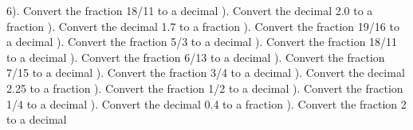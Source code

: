 \documentclass{article}%
\begin{document}
6). Convert the fraction 18/11 to a decimal%
\newline%
\newline%
). Convert the decimal 2.0 to a fraction%
\newline%
\newline%
). Convert the decimal 1.7 to a fraction%
\newline%
\newline%
). Convert the fraction 19/16 to a decimal%
\newline%
\newline%
). Convert the fraction 5/3 to a decimal%
\newline%
\newline%
). Convert the fraction 18/11 to a decimal%
\newline%
\newline%
). Convert the fraction 6/13 to a decimal%
\newline%
\newline%
). Convert the fraction 7/15 to a decimal%
\newline%
\newline%
). Convert the fraction 3/4 to a decimal%
\newline%
\newline%
). Convert the decimal 2.25 to a fraction%
\newline%
\newline%
). Convert the fraction 1/2 to a decimal%
\newline%
\newline%
). Convert the fraction 1/4 to a decimal%
\newline%
\newline%
). Convert the decimal 0.4 to a fraction%
\newline%
\newline%
). Convert the fraction 2 to a decimal%
\newline%
\end{document}
